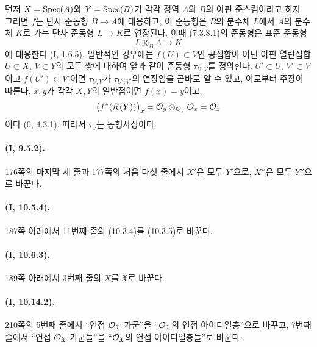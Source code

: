 먼저 $X=\operatorname{Spec}(A)$와 $Y=\operatorname{Spec}(B)$가 각각 정역 $A$와 $B$의 아핀
준스킴이라고 하자. 그러면 $f$는 단사 준동형 $B\to A$에 대응하고, 이
준동형은 $B$의 분수체 $L$에서 $A$의 분수체 $K$로 가는 단사 준동형
$L\to K$로 연장된다. 이때
\hyperref[ega2:addendum:I.7.3.8.1-ko]{(7.3.8.1)}의 준동형은 표준 준동형
\[
  L\otimes_B A\to K
\]
에 대응한다 (I, 1.6.5). 일반적인 경우에는 $f(U)\subset V$인 공집합이
아닌 아핀 열린집합 $U\subset X$, $V\subset Y$의 모든 쌍에 대하여 앞과
같이 준동형 $\tau_{U,V}$를 정의한다. $U'\subset U$, $V'\subset V$이고
$f(U')\subset V'$이면 $\tau_{U,V}$가 $\tau_{U',V'}$의 연장임을 곧바로
알 수 있고, 이로부터 주장이 따른다. $x,y$가 각각 $X,Y$의 일반점이면
$f(x)=y$이고,
\[
  \bigl(f^*(\mathcal{R}(Y))\bigr)_x
  =\mathcal{O}_y\otimes_{\mathcal{O}_y}\mathcal{O}_x
  =\mathcal{O}_x
\]
이다 (0, 4.3.1). 따라서 $\tau_x$는 동형사상이다.

\paragraph{(I, 9.5.2).}
176쪽의 마지막 세 줄과 177쪽의 처음 다섯 줄에서 $X'$은 모두 $Y'$으로,
$X''$은 모두 $Y''$으로 바꾼다.

\paragraph{(I, 10.5.4).}
187쪽 아래에서 11번째 줄의 (10.3.4)를 (10.3.5)로 바꾼다.

\paragraph{(I, 10.6.3).}
189쪽 아래에서 3번째 줄의 $X$를 $\mathfrak X$로 바꾼다.

\paragraph{(I, 10.14.2).}
210쪽의 5번째 줄에서 ``연접 $\mathcal{O}_{\mathfrak X}$-가군''을
``$\mathcal{O}_{\mathfrak X}$의 연접 아이디얼층''으로 바꾸고, 7번째 줄에서
``연접 $\mathcal{O}_{\mathfrak X}$-가군들''을
``$\mathcal{O}_{\mathfrak X}$의 연접 아이디얼층들''로 바꾼다.
